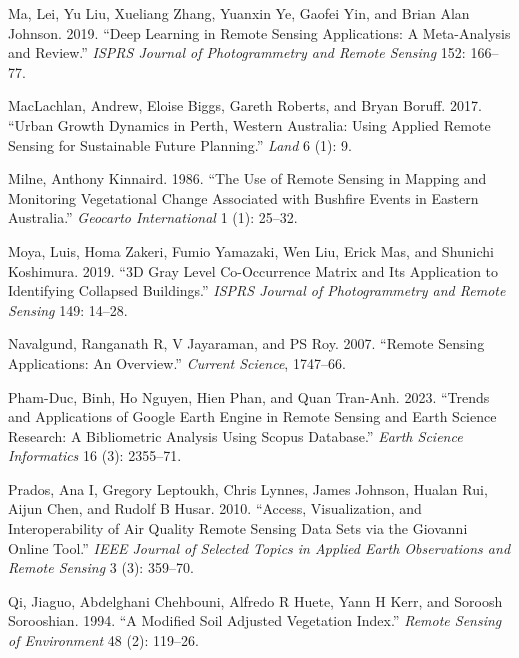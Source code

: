\documentclass[
  letterpaper,
  DIV=11,
  numbers=noendperiod]{scrreprt}
\newlength{\cslhangindent}
\newlength{\cslentryspacingunit} %
\newenvironment{CSLReferences}[2] %
 {%
  \setlength{\parindent}{0pt}
  \ifodd #1
  \let\oldpar\par
  \def\par{\hangindent=\cslhangindent\oldpar}
  \fi
  \setlength{\parskip}{#2\cslentryspacingunit}
 }%
 {}
\begin{document}
\begin{CSLReferences}{1}{0}
\leavevmode{}%
Ma, Lei, Yu Liu, Xueliang Zhang, Yuanxin Ye, Gaofei Yin, and Brian Alan
Johnson. 2019. {``Deep Learning in Remote Sensing Applications: A
Meta-Analysis and Review.''} \emph{ISPRS Journal of Photogrammetry and
Remote Sensing} 152: 166--77.

\leavevmode{}%
MacLachlan, Andrew, Eloise Biggs, Gareth Roberts, and Bryan Boruff.
2017. {``Urban Growth Dynamics in Perth, Western Australia: Using
Applied Remote Sensing for Sustainable Future Planning.''} \emph{Land} 6
(1): 9.

\leavevmode{}%
Milne, Anthony Kinnaird. 1986. {``The Use of Remote Sensing in Mapping
and Monitoring Vegetational Change Associated with Bushfire Events in
Eastern Australia.''} \emph{Geocarto International} 1 (1): 25--32.

\leavevmode{}%
Moya, Luis, Homa Zakeri, Fumio Yamazaki, Wen Liu, Erick Mas, and
Shunichi Koshimura. 2019. {``3D Gray Level Co-Occurrence Matrix and Its
Application to Identifying Collapsed Buildings.''} \emph{ISPRS Journal
of Photogrammetry and Remote Sensing} 149: 14--28.

\leavevmode{}%
Navalgund, Ranganath R, V Jayaraman, and PS Roy. 2007. {``Remote Sensing
Applications: An Overview.''} \emph{Current Science}, 1747--66.

\leavevmode{}%
Pham-Duc, Binh, Ho Nguyen, Hien Phan, and Quan Tran-Anh. 2023. {``Trends
and Applications of Google Earth Engine in Remote Sensing and Earth
Science Research: A Bibliometric Analysis Using Scopus Database.''}
\emph{Earth Science Informatics} 16 (3): 2355--71.

\leavevmode{}%
Prados, Ana I, Gregory Leptoukh, Chris Lynnes, James Johnson, Hualan
Rui, Aijun Chen, and Rudolf B Husar. 2010. {``Access, Visualization, and
Interoperability of Air Quality Remote Sensing Data Sets via the
Giovanni Online Tool.''} \emph{IEEE Journal of Selected Topics in
Applied Earth Observations and Remote Sensing} 3 (3): 359--70.

\leavevmode{}%
Qi, Jiaguo, Abdelghani Chehbouni, Alfredo R Huete, Yann H Kerr, and
Soroosh Sorooshian. 1994. {``A Modified Soil Adjusted Vegetation
Index.''} \emph{Remote Sensing of Environment} 48 (2): 119--26.


\end{CSLReferences}
\end{document}
